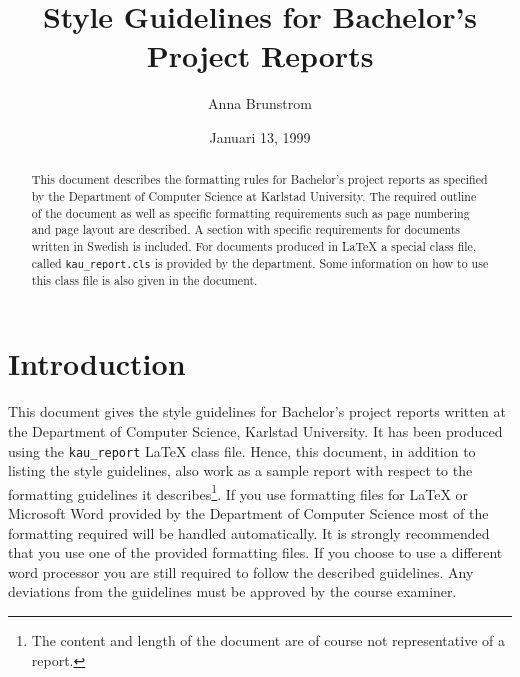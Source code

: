 \documentclass[12pt,twoside]{kau_report}
\title{Style Guidelines for Bachelor's Project Reports}
\author{Anna Brunstrom}
\date{Januari 13, 1999}
\begin{document}
\makekautitle

\copyrightpage

\begin{frontmatter}

\approved

\begin{abstract}
This document describes the formatting rules for Bachelor's project
reports as
specified by the Department of Computer Science at Karlstad University.
The required outline of the document as well as specific
formatting requirements such as page numbering and page layout are
described. A section with specific requirements for documents written
in Swedish is included. For documents produced in LaTeX a special
class file, called {\tt kau\_report.cls} is provided by the
department. Some information on how to use this class file is also
given in the document.
\end{abstract}


  \tableofcontents

  \listoffigures

  \listoftables
\end{frontmatter}


\section{Introduction}
This document gives the style guidelines for Bachelor's project
reports written at the Department of Computer Science, Karlstad
University. It has been produced using the {\tt kau\_report} LaTeX
class file. Hence, this document, in addition to listing the style
guidelines, also work as a sample report with respect to the
formatting guidelines it describes\footnote{The content and 
length of the document are of course not representative of a report.}.
If you use formatting files for LaTeX or Microsoft Word provided by
the Department of Computer Science most of the formatting required
will be handled automatically. It is strongly recommended that you use
one of the provided formatting files.
If you choose to use a different word processor you are still required
to follow the described guidelines. Any deviations from the guidelines must
be approved by the course examiner. 
\end{document}
